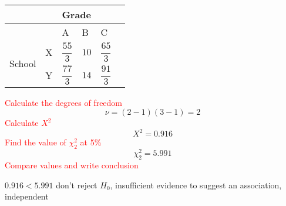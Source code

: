 \documentclass{article}[18pt]
\begin{document}
\begin{tabularx}{\textwidth}{|X|X|X|X|X|X|}
\hline
&&\multicolumn{3}{|X|}{Grade}\\
\hline
&&A&B&C\\
\hline
\multirow{2}{4em}{School}&X&$$\frac{55}{3}$$&$$10$$&$$\frac{65}{3}$$\\
\cline{2-5}
&Y&$$\frac{77}{3}$$&$$14$$&$$\frac{91}{3}$$\\
\hline
\end{tabularx}
\textcolor{red}{Calculate the degrees of freedom}
$$\nu=(2-1)(3-1)=2$$
\textcolor{red}{Calculate $X^2$}
$$X^2=0.916$$
\textcolor{red}{Find the value of $\chi^2_2$ at 5\%}
$$\chi^2_2=5.991$$
\textcolor{red}{Compare values and write conclusion}
\begin{center}
$0.916<5.991$ don't reject $H_0$, insufficient evidence to suggest an association, independent
\end{center}
\end{document}
